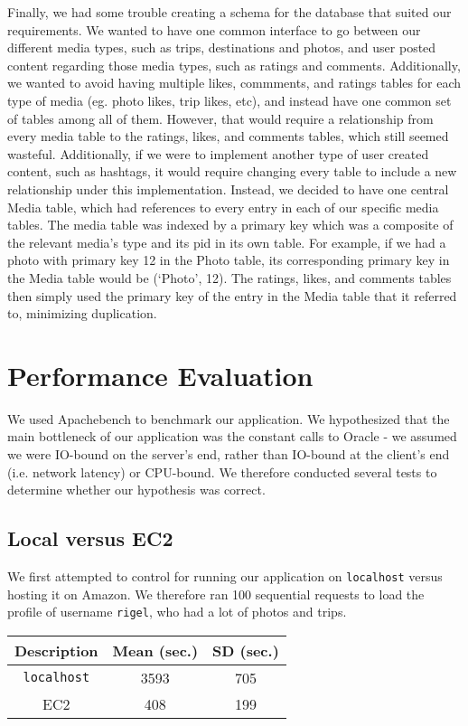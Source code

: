 \documentclass[11pt]{amsart}
\begin{document}
Finally, we had some trouble creating a schema for the database that suited our requirements. We wanted to have
one common interface to go between our different media types, such as trips, destinations and photos, and user posted
content regarding those media types, such as ratings and comments. Additionally, we wanted to avoid having multiple 
likes, commments, and ratings tables for each type of media (eg. photo likes, trip likes, etc), and instead
have one common set of tables among all of them. However, that would require a relationship from every media
table to the ratings, likes, and comments tables, which still seemed wasteful. Additionally, if we were to implement
another type of user created content, such as hashtags, it would require changing every table to include a
new relationship under this implementation. Instead, we decided to have one central Media table, which had references to
every entry in each of our specific media tables. The media table was indexed by a primary key which was a composite
of the relevant media's type and its pid in its own table. For example, if we had a photo with primary key 12 in the Photo table, its corresponding primary key in the Media table would be (`Photo', 12). The ratings, likes, and comments tables then simply used the primary key of the entry in the Media table that it referred to, minimizing duplication.

\section{Performance Evaluation}
We used Apachebench to benchmark our application. We hypothesized that the main bottleneck of our
application was the constant calls to Oracle - we assumed we were IO-bound on the server's end,
rather than IO-bound at the client's end (i.e. network latency) or CPU-bound. We therefore conducted
several tests to determine whether our hypothesis was correct.

\subsection{Local versus EC2}
We first attempted to control for running our application on {\tt localhost} versus hosting it on
Amazon. We therefore ran 100 sequential requests to load the profile of username {\tt rigel},
who had a lot of photos and trips. \\

\begin{tabular}{|c|c|c|}
  \hline {\bf Description} & {\bf Mean (sec.)} & {\bf SD (sec.)} \\
  \hline {\tt localhost} & 3593 & 705 \\
  \hline EC2 & 408 & 199 \\
  \hline
\end{tabular} \\
\end{document}
